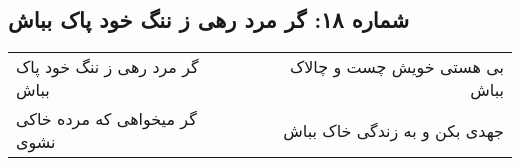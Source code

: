 \begin{center}
\section*{شماره ۱۸: گر مرد رهی ز ننگ خود پاک بباش}
\label{sec:018}
\begin{longtable}{l p{0.5cm} r}
گر مرد رهی ز ننگ خود پاک بباش
&&
بی هستی خویش چست و چالاک بباش
\\
گر میخواهی که مرده خاکی نشوی
&&
جهدی بکن و به زندگی خاک بباش
\\
\end{longtable}
\end{center}
